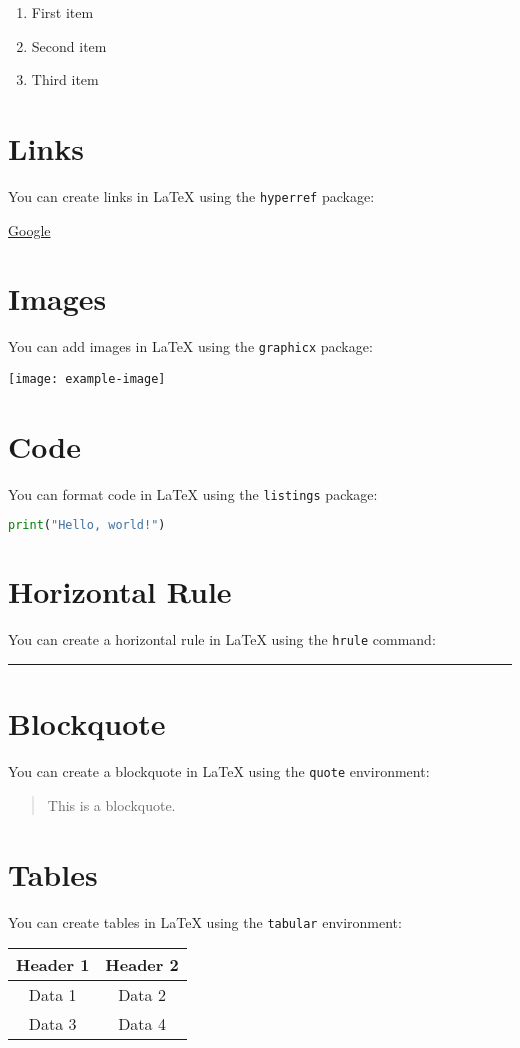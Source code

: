 \documentclass{article}
\begin{document}
\begin{enumerate}
  \item First item
  \item Second item
  \item Third item
\end{enumerate}

\section{Links}

You can create links in LaTeX using the \texttt{hyperref} package:

\usepackage{hyperref}

\href{https://www.google.com}{Google}

\section{Images}

You can add images in LaTeX using the \texttt{graphicx} package:

\usepackage{graphicx}

\texttt{[image: example-image]}

\section{Code}

You can format code in LaTeX using the \texttt{listings} package:

\usepackage{listings}

\begin{lstlisting}[language=Python]
print("Hello, world!")
\end{lstlisting}

\section{Horizontal Rule}

You can create a horizontal rule in LaTeX using the \texttt{hrule} command:

\hrule

\section{Blockquote}

You can create a blockquote in LaTeX using the \texttt{quote} environment:

\begin{quote}
  This is a blockquote.
\end{quote}

\section{Tables}

You can create tables in LaTeX using the \texttt{tabular} environment:

\begin{tabular}{|c|c|}
  \hline
  Header 1 & Header 2 \\
  \hline
  Data 1   & Data 2   \\
  Data 3   & Data 4   \\
  \hline
\end{tabular}
\end{document}
